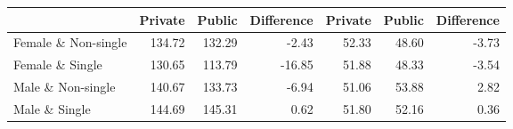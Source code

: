 
\begin{tabular}{l|r|r|r|r|r|r}
\hline
  & Private & Public & Difference & Private & Public & Difference\\
\hline
Female \& Non-single & 134.72 & 132.29 & -2.43 & 52.33 & 48.60 & -3.73\\
\hline
Female \& Single & 130.65 & 113.79 & -16.85 & 51.88 & 48.33 & -3.54\\
\hline
Male \& Non-single & 140.67 & 133.73 & -6.94 & 51.06 & 53.88 & 2.82\\
\hline
Male \& Single & 144.69 & 145.31 & 0.62 & 51.80 & 52.16 & 0.36\\
\hline
\end{tabular}
